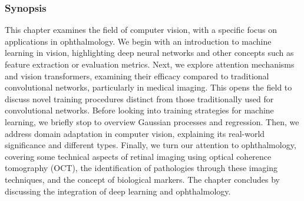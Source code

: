 \subsubsection{Synopsis} This chapter examines the field of computer vision, with a specific focus on applications in ophthalmology. We begin with an introduction to machine learning in vision, highlighting deep neural networks and other concepts such as feature extraction or evaluation metrics. Next, we explore attention mechanisms and vision transformers, examining their efficacy compared to traditional convolutional networks, particularly in medical imaging. This opens the field to discuss novel training procedures distinct from those traditionally used for convolutional networks. Before looking into training strategies for machine learning, we briefly stop to overview Gaussian processes and regression. Then, we address domain adaptation in computer vision, explaining its real-world significance and different types. Finally, we turn our attention to ophthalmology, covering some technical aspects of retinal imaging using optical coherence tomography (OCT), the identification of pathologies through these imaging techniques, and the concept of biological markers. The chapter concludes by discussing the integration of deep learning and ophthalmology.






